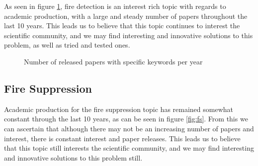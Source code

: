 \documentclass[runningheads]{llncs}
\begin{document}
As seen in figure \ref{fig:fd}, fire detection is an interest rich topic with regards to academic production, with a large and steady number of papers throughout the last 10 years. This leads us to believe that this topic continues to interest the scientific community, and we may find interesting and innovative solutions to this problem, as well as tried and tested ones.

\begin{figure}[htb]
\caption{Number of released papers with specific keywords per year}
\label{fig:fd}
\end{figure}

\subsection{Fire Suppression}

Academic production for the fire suppression topic has remained somewhat constant through the last 10 years, as can be seen in figure \ref{fig:fs}. From this we can ascertain that although there may not be an increasing number of papers and interest, there is constant interest and paper releases. This leads us to believe that this topic still interests the scientific community, and we may find interesting and innovative solutions to this problem still. 
\end{document}
